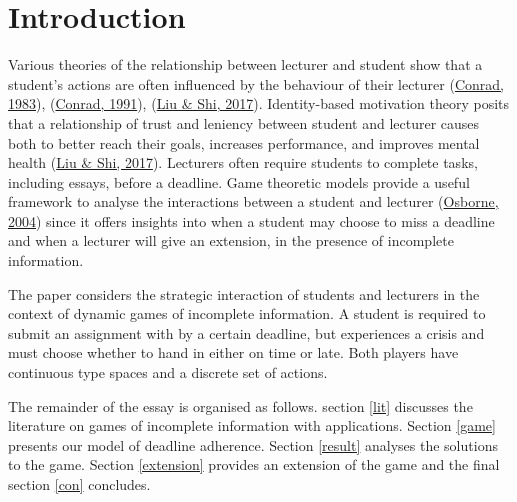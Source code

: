 \documentclass[11pt,preprint, authoryear]{elsarticle}
\numberwithin{equation}{section}
\numberwithin{figure}{section}
\numberwithin{table}{section}
\begin{document}
\renewcommand{\contentsname}{Table of Contents}
{\tableofcontents}

\pagestyle{fancy}
\chead{}
\rhead{}
\lfoot{}
\lhead{}
\cfoot{}


\headsep 35pt %




\newpage

\hypertarget{introduction}{%
\section{\texorpdfstring{Introduction
\label{intro}}{Introduction }}\label{introduction}}

Various theories of the relationship between lecturer and student show
that a student's actions are often influenced by the behaviour of their
lecturer (\protect\hyperlink{ref-power}{Conrad, 1983}),
(\protect\hyperlink{ref-comm}{Conrad, 1991}),
(\protect\hyperlink{ref-trust}{Liu \& Shi, 2017}). Identity-based
motivation theory posits that a relationship of trust and leniency
between student and lecturer causes both to better reach their goals,
increases performance, and improves mental health
(\protect\hyperlink{ref-trust}{Liu \& Shi, 2017}). Lecturers often
require students to complete tasks, including essays, before a deadline.
Game theoretic models provide a useful framework to analyse the
interactions between a student and lecturer
(\protect\hyperlink{ref-book}{Osborne, 2004}) since it offers insights
into when a student may choose to miss a deadline and when a lecturer
will give an extension, in the presence of incomplete information.

The paper considers the strategic interaction of students and lecturers
in the context of dynamic games of incomplete information. A student is
required to submit an assignment with by a certain deadline, but
experiences a crisis and must choose whether to hand in either on time
or late. Both players have continuous type spaces and a discrete set of
actions.

The remainder of the essay is organised as follows. section \ref{lit}
discusses the literature on games of incomplete information with
applications. Section \ref{game} presents our model of deadline
adherence. Section \ref{result} analyses the solutions to the game.
Section \ref{extension} provides an extension of the game and the final
section \ref{con} concludes.
\end{document}
